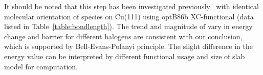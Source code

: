 \documentclass[%
 reprint,
 amsmath,amssymb,
 aps,
prb,
floatfix,
]{revtex4-2}
\newcommand{\comm}{\color{Purple}} %
\begin{document}
{It should be noted that this step has been investigated previously~\cite{jacs2013} with identical molecular orientation of species on Cu(111) using optB86b XC-functional (data listed in Table~\ref{table:bondlength}). The trend and magnitude of vary in energy change and barrier for different halogens are consistent with our conclusion, which is supported by Bell-Evans-Polanyi principle. The slight difference in the energy value can be interpreted by different functional usage and size of slab model for computation.









}
\end{document}
